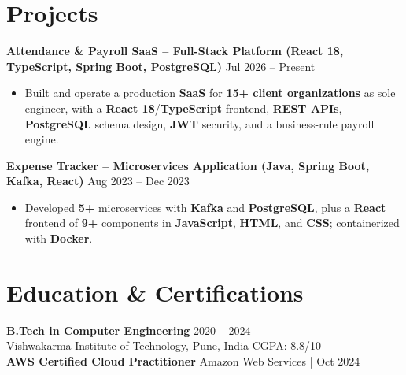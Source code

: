 \documentclass[a4paper,10pt]{article}
\begin{document}
\section*{Projects}

\textbf{Attendance \& Payroll SaaS -- Full-Stack Platform (React 18, TypeScript, Spring Boot, PostgreSQL)} \hfill Jul 2026 -- Present
\begin{itemize}[leftmargin=*]
    \item Built and operate a production \textbf{SaaS} for \textbf{15+ client organizations} as sole engineer, with a \textbf{React 18}/\textbf{TypeScript} frontend, \textbf{REST APIs}, \textbf{PostgreSQL} schema design, \textbf{JWT} security, and a business-rule payroll engine.
\end{itemize}

\textbf{Expense Tracker -- Microservices Application (Java, Spring Boot, Kafka, React)} \hfill Aug 2023 -- Dec 2023
\begin{itemize}[leftmargin=*]
    \item Developed \textbf{5+} microservices with \textbf{Kafka} and \textbf{PostgreSQL}, plus a \textbf{React} frontend of \textbf{9+} components in \textbf{JavaScript}, \textbf{HTML}, and \textbf{CSS}; containerized with \textbf{Docker}.
\end{itemize}

\section*{Education \& Certifications}
\textbf{B.Tech in Computer Engineering} \hfill 2020 -- 2024 \\
Vishwakarma Institute of Technology, Pune, India \hfill CGPA: 8.8/10 \\
\textbf{AWS Certified Cloud Practitioner} \hfill Amazon Web Services \;|\; Oct 2024
\end{document}
